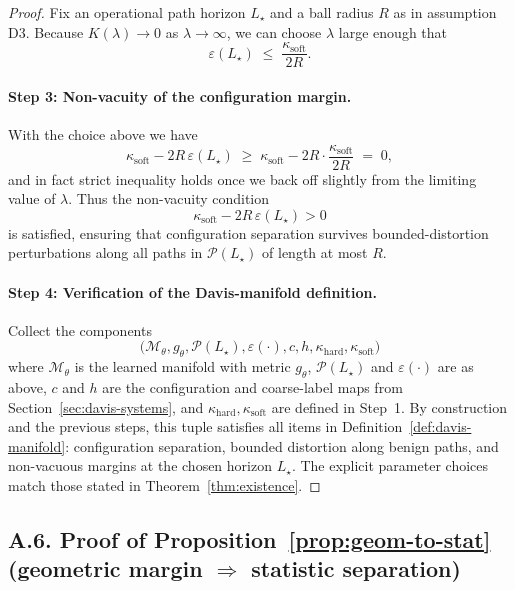 \documentclass[11pt]{article}
\begin{document}
\begin{proof}
Fix an operational path horizon $L_\star$ and a ball radius $R$ as in assumption D3.  Because
$K(\lambda)\to 0$ as $\lambda\to\infty$, we can choose $\lambda$ large enough that
\[
\varepsilon(L_\star)
\;\le\;
\frac{\kappa_{\mathrm{soft}}}{2R}.
\]

\paragraph{Step 3: Non-vacuity of the configuration margin.}
With the choice above we have
\[
\kappa_{\mathrm{soft}} - 2R\,\varepsilon(L_\star)
\;\ge\;
\kappa_{\mathrm{soft}} - 2R\cdot \frac{\kappa_{\mathrm{soft}}}{2R}
\;=\;
0,
\]
and in fact strict inequality holds once we back off slightly from the limiting value of $\lambda$.
Thus the non-vacuity condition
\[
\kappa_{\mathrm{soft}} - 2R\,\varepsilon(L_\star) > 0
\]
is satisfied, ensuring that configuration separation survives bounded-distortion perturbations
along all paths in $\mathcal{P}(L_\star)$ of length at most $R$.

\paragraph{Step 4: Verification of the Davis-manifold definition.}
Collect the components
\[
\bigl(\mathcal{M}_\theta, g_\theta, \mathcal{P}(L_\star), \varepsilon(\cdot),
c, h, \kappa_{\mathrm{hard}}, \kappa_{\mathrm{soft}}\bigr)
\]
where $\mathcal{M}_\theta$ is the learned manifold with metric $g_\theta$, $\mathcal{P}(L_\star)$ and
$\varepsilon(\cdot)$ are as above, $c$ and $h$ are the configuration and coarse-label maps from
Section~\ref{sec:davis-systems}, and $\kappa_{\mathrm{hard}},\kappa_{\mathrm{soft}}$ are defined in Step~1.
By construction and the previous steps, this tuple satisfies all items in
Definition~\ref{def:davis-manifold}: configuration separation, bounded distortion along benign
paths, and non-vacuous margins at the chosen horizon $L_\star$.  The explicit parameter choices
match those stated in Theorem~\ref{thm:existence}. 
\end{proof}

\medskip

\subsection*{A.6. Proof of Proposition~\ref{prop:geom-to-stat} (geometric margin $\Rightarrow$ statistic separation)}
\end{document}
